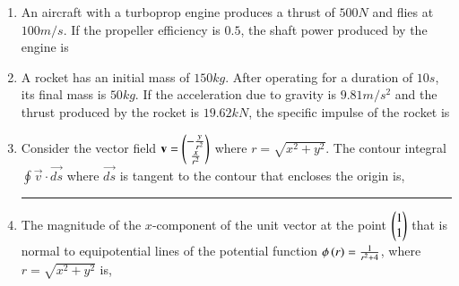 \documentclass[journal]{IEEEtran}
\begin{document}
\begin{enumerate}
\begin{enumerate}
\end{enumerate}
\item An aircraft with a turboprop engine produces a thrust of $500 N$ and flies at $100 m/s$. If the propeller efficiency is $0.5$, the shaft power produced by the engine is 
	\begin{enumerate}
\end{enumerate}
\item A rocket has an initial mass of $150 kg$. After operating for a duration of $10 s$, its final mass is $50 kg$. If the acceleration due to gravity is $9.81 m/s^2$ and the thrust produced by the rocket is $19.62 kN$, the specific impulse of the rocket is
	\begin{enumerate}
\end{enumerate}
\item Consider the vector field $\mathbf{v}=\begin{pmatrix}-\frac{y}{r^2} \\ \frac{x}{r^2}\end{pmatrix}$ where $r= \sqrt{x^2+y^2}$. The contour integral $ \oint \vec{v} \cdot \vec{ds}$ where $\vec{ds}$ is tangent to the contour that encloses the origin is, \rule{2cm}{0.2pt} 
\item The magnitude of the $x$-component of the unit vector at the point $\begin{pmatrix}1\\1\end{pmatrix}$ that is normal to equipotential lines of the potential function $\phi\left(r\right)=\frac{1}{r^2+4}$, where $r=\sqrt{x^2+y^2}$ is,

\end{enumerate}
\end{document}
